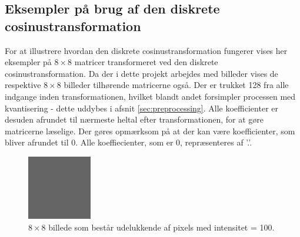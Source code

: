\subsection{Eksempler på brug af den diskrete cosinustransformation}
For at illustrere hvordan den diskrete cosinustransformation fungerer vises her eksempler på $8\times8$ matricer transformeret ved den diskrete cosinustransformation. Da der i dette projekt arbejdes med billeder vises de respektive $8\times8$ billeder tilhørende matricerne også. Der er trukket 128 fra alle indgange inden transformationen, hvilket blandt andet forsimpler processen med kvantisering - dette uddybes i afsnit \ref{sec:preprocessing}. Alle koefficienter er desuden afrundet til nærmeste heltal efter transformationen, for at gøre matricerne læselige. Der gøres opmærksom på at der kan være koefficienter, som bliver afrundet til 0. Alle koeffiecienter, som er 0, repræsenteres af '.'.
\begin{figure}[htbp]
\centering
\includegraphics[width=0.25\textwidth]{Billeder/8x8_eks1.png}
\caption{$8\times8$ billede som består udelukkende af pixels med intensitet = 100.\label{fig:8x8graa}}
\end{figure}

